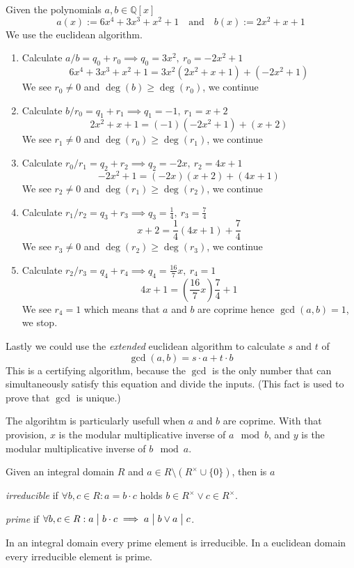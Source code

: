 \begin{example}
   Given the polynomials \(a, b \in \mathbb{Q}[x]\)
   \[a(x) := 6x^4 + 3x^3 + x^2 + 1 \quad\text{and}\quad b(x) := 2x^2 + x + 1\]
   We use the euclidean algorithm.

   \begin{enumerate}
      \item Calculate \(a / b = q_0 + r_0 \implies q_0 = 3x^2,~r_0 = -2x^2 + 1\)
         \[6x^4 + 3x^3 + x^2 + 1 = 3x^2 (2x^2 + x + 1) + (-2x^2 + 1)\]
         We see \(r_0 \neq 0\) and \(\deg(b) \geq \deg(r_0)\), we continue
      \item Calculate \(b / r_0 = q_1 + r_1 \implies q_1 = -1,~r_1 = x+2\)
         \[2x^2 + x + 1 = (-1) (-2x^2 + 1) + (x + 2)\]
         We see \(r_1 \neq 0\) and \(\deg(r_0) \geq \deg(r_1)\), we continue
      \item Calculate \(r_0 / r_1 = q_2 + r_2 \implies q_2 = -2x,~r_2 = 4x+1\)
         \[-2x^2 + 1 = (-2x) (x+2) + (4x + 1)\]
         We see \(r_2 \neq 0\) and \(\deg(r_1) \geq \deg(r_2)\), we continue
      \item Calculate \(r_1 / r_2 = q_3 + r_3 \implies q_3 = \frac{1}{4},~r_3 = \frac{7}{4}\)
         \[x + 2 = \frac{1}{4} (4x + 1) + \frac{7}{4}\]
         We see \(r_3 \neq 0\) and \(\deg(r_2) \geq \deg(r_3)\), we continue
      \item Calculate \(r_2 / r_3 = q_4 + r_4 \implies q_4 = \frac{16}{7}x,~r_4 = 1\)
         \[4x + 1 = \left(\frac{16}{7}x\right) \frac{7}{4} + 1\]
         We see \(r_4 = 1\) which means that \(a\) and \(b\) are coprime hence \(\gcd(a, b) = 1\), we stop.
   \end{enumerate}
\end{example}
\begin{remark}
   Lastly we could use the \textit{extended} euclidean algorithm to calculate \(s\) and \(t\) of
   \[\gcd(a, b) = s \cdot a + t \cdot b\]
   This is a certifying algorithm, because the \(\gcd\) is the only number that can simultaneously satisfy this equation and divide the inputs.
   (This fact is used to prove that \(\gcd\) is unique.)

   The algorihtm is particularly usefull when \(a\) and \(b\) are coprime.
   With that provision, \(x\) is the modular multiplicative inverse of \(a \mod b\), and \(y\) is the modular multiplicative inverse of \(b \mod a\).
\end{remark}

\begin{definition}
   Given an integral domain \(R\) and \(a \in R \setminus (R^{\times} \cup \{0\})\), then is \(a\)

   \emph{irreducible} if \(\forall b, c \in R: a = b \cdot c\) holds \(b \in R^{\times} \lor c \in R^{\times}\).

   \emph{prime} if \(\forall b, c \in R: a \divides b \cdot c \implies a \divides b \lor a \divides c\).
\end{definition}
\begin{remark}
   In an integral domain every prime element is irreducible.
   In a euclidean domain every irreducible element is prime.
\end{remark}

